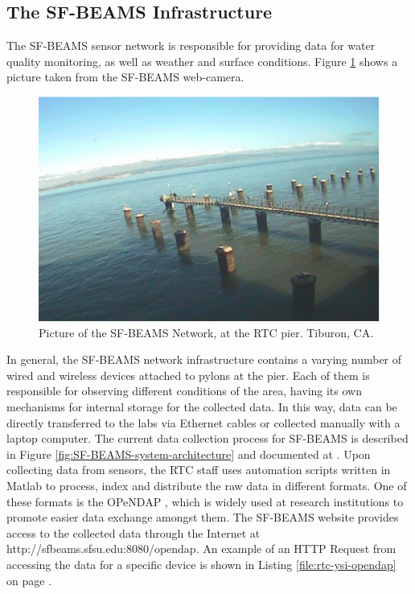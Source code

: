 \subsection{The SF-BEAMS Infrastructure}
\label{sec:sfbeams}

The SF-BEAMS sensor network is responsible for providing data for water quality
monitoring, as well as weather and surface conditions. Figure
\ref{fig:sf-beams} shows a picture taken from the SF-BEAMS web-camera.

\begin{figure}[!t]
  \centering
    \includegraphics[scale=0.7]{../diagrams/cam_image-oct15}
  \caption{Picture of the SF-BEAMS Network, at the RTC pier. Tiburon, CA.}
  \label{fig:sf-beams}
\end{figure}

In general, the SF-BEAMS network infrastructure contains a varying number of
wired and wireless devices attached to pylons at the pier. Each of them
is responsible for observing different conditions of the area, having its own
mechanisms for internal storage for the collected data. In this way, data can
be directly transferred to the labs via Ethernet cables or collected manually
with a laptop computer. The current data collection process for SF-BEAMS is
described in Figure \ref{fig:SF-BEAMS-system-architecture} and documented at
\cite{sfbeams-current-system}. Upon collecting data from sensors, the RTC
staff uses automation scripts written in Matlab \cite{matlab} to process,
index and distribute the raw data in different formats. One of these formats
is the OPeNDAP \cite{opendap}, which is widely used at research institutions
to promote easier data exchange amongst them. The SF-BEAMS website provides
access to the collected data through the Internet at
http://sfbeams.sfsu.edu:8080/opendap. An example of an HTTP Request from
accessing the data for a specific device is shown in Listing
\ref{file:rtc-ysi-opendap} on page \pageref{file:rtc-ysi-opendap}.

